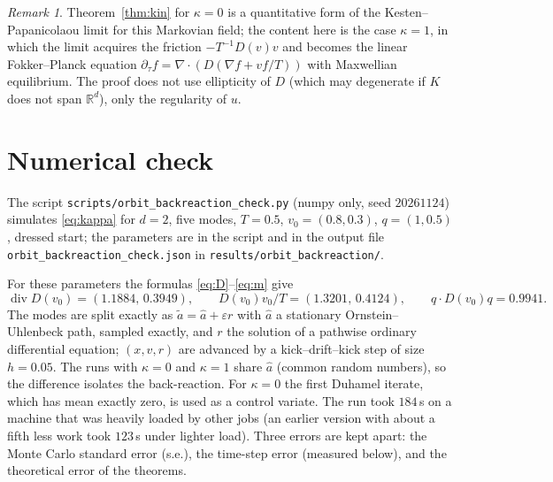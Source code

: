 \documentclass[11pt]{article}
\newcommand{\eps}{\varepsilon}
\newcommand{\Div}{\operatorname{div}}
\theoremstyle{remark}
\newtheorem{remark}[theorem]{Remark}
\begin{document}
\begin{remark}
Theorem~\ref{thm:kin} for $\kappa=0$ is a quantitative form of the
Kesten--Papanicolaou limit for this Markovian field; the content here is
the case $\kappa=1$, in which the limit acquires the friction
$-T^{-1}D(v)v$ and becomes the linear Fokker--Planck equation
$\partial_\tau f=\nabla\cdot(D(\nabla f+vf/T))$ with Maxwellian equilibrium.
The proof does not use ellipticity of $D$ (which may degenerate if $K$ does
not span $\mathbb{R}^d$), only the regularity of $u$.
\end{remark}

\section{Numerical check}

\begin{sloppypar}
The script \texttt{scripts/orbit\_backreaction\_check.py} (numpy only,
seed $20261124$) simulates \eqref{eq:kappa} for $d=2$, five modes,
$T=0.5$, $v_0=(0.8,0.3)$, $q=(1,0.5)$, dressed start; the parameters are in
the script and in the output file
\texttt{orbit\_backreaction\_check.json} in
\texttt{results/orbit\_backreaction/}.
\end{sloppypar}
\noindent For these parameters the formulas \eqref{eq:D}--\eqref{eq:m} give
\[
  \Div D(v_0)=(1.1884,\,0.3949),\qquad
  D(v_0)v_0/T=(1.3201,\,0.4124),\qquad q\cdot D(v_0)q=0.9941 .
\]
The modes are split exactly as $\tilde a=\hat a+\eps r$ with $\hat a$ a
stationary Ornstein--Uhlenbeck path, sampled exactly, and $r$ the solution
of a pathwise ordinary differential equation; $(x,v,r)$ are advanced by a
kick--drift--kick step of size $h=0.05$. The runs with $\kappa=0$ and
$\kappa=1$ share $\hat a$ (common random numbers), so the difference
isolates the back-reaction. For $\kappa=0$ the first Duhamel iterate, which
has mean exactly zero, is used as a control variate. The run took
$184$\,s on a machine that was heavily loaded by other jobs (an earlier
version with about a fifth less work took $123$\,s under lighter load). Three errors are kept apart: the
Monte Carlo standard error (s.e.), the time-step error (measured below),
and the theoretical error of the theorems.
\end{document}
